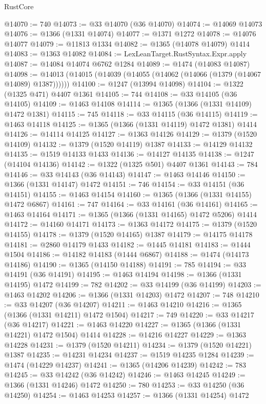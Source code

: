 \begin{lexlean}{RustCore}
\begin{coremodule}
@14070 := 740
@14073 := @33 @14070 (@36 @14070)
@14074 := @14069 @14073
@14076 := @1366 (@1331 @14074)
@14077 := @1371 @1272
@14078 := @14076 @14077
@14079 := @11813 @1334
@14082 := @1365 (@14078 @14079) @1414
@14083 := @1363 @14082
@14084 := LexLeanTarget.RustSyntax.Expr.apply
@14087 := @14084 @14074 @6762 @1284
@14089 := @1474 (@14083 @14087)
@14098 := @14013 (@14015 (@14039 (@14055 (@14062 (@14066 (@1379 (@14067 @14089) @1387))))))
@14100 := @1247 (@13994 @14098)
@14104 := @1322 (@1325 @471) @4407 @1361
@14105 := 744
@14108 := @33 @14105 (@36 @14105)
@14109 := @1463 @14108
@14114 := @1365 (@1366 (@1331 @14109) @1472 @1381)
@14115 := 745
@14118 := @33 @14115 (@36 @14115)
@14119 := @1463 @14118
@14125 := @1365 (@1366 (@1331 @14119) @1472 @1381) @1414
@14126 := @14114 @14125
@14127 := @1363 @14126
@14129 := @1379 (@1520 @14109)
@14132 := @1379 (@1520 @14119) @1387
@14133 := @14129 @14132
@14135 := @1519 @14133 @1433
@14136 := @14127 @14135
@14138 := @1247 (@14104 @14136)
@14142 := @1322 (@1325 @501) @4407 @1361
@14143 := 784
@14146 := @33 @14143 (@36 @14143)
@14147 := @1463 @14146
@14150 := @1366 (@1331 @14147) @1472
@14151 := 746
@14154 := @33 @14151 (@36 @14151)
@14155 := @1463 @14154
@14160 := @1365 (@1366 (@1331 @14155) @1472 @6867)
@14161 := 747
@14164 := @33 @14161 (@36 @14161)
@14165 := @1463 @14164
@14171 := @1365 (@1366 (@1331 @14165) @1472 @5206) @1414
@14172 := @14160 @14171
@14173 := @1363 @14172
@14175 := @1379 (@1520 @14155)
@14178 := @1379 (@1520 @14165) @1387
@14179 := @14175 @14178
@14181 := @2860 @14179 @1433
@14182 := @1445 @14181
@14183 := @1444 @1504
@14186 := @14182 @14183 (@1444 @6867)
@14188 := @1474 (@14173 @14186)
@14190 := @1365 (@14150 @14188)
@14191 := 785
@14194 := @33 @14191 (@36 @14191)
@14195 := @1463 @14194
@14198 := @1366 (@1331 @14195) @1472
@14199 := 782
@14202 := @33 @14199 (@36 @14199)
@14203 := @1463 @14202
@14206 := @1366 (@1331 @14203) @1472
@14207 := 748
@14210 := @33 @14207 (@36 @14207)
@14211 := @1463 @14210
@14216 := @1365 (@1366 (@1331 @14211) @1472 @1504)
@14217 := 749
@14220 := @33 @14217 (@36 @14217)
@14221 := @1463 @14220
@14227 := @1365 (@1366 (@1331 @14221) @1472 @1504) @1414
@14228 := @14216 @14227
@14229 := @1363 @14228
@14231 := @1379 (@1520 @14211)
@14234 := @1379 (@1520 @14221) @1387
@14235 := @14231 @14234
@14237 := @1519 @14235 @1284
@14239 := @1474 (@14229 @14237)
@14241 := @1365 (@14206 @14239)
@14242 := 783
@14245 := @33 @14242 (@36 @14242)
@14246 := @1463 @14245
@14249 := @1366 (@1331 @14246) @1472
@14250 := 780
@14253 := @33 @14250 (@36 @14250)
@14254 := @1463 @14253
@14257 := @1366 (@1331 @14254) @1472

\end{coremodule}
\end{lexlean}
